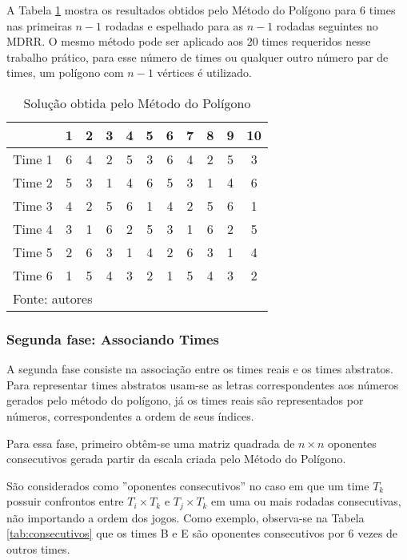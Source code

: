 \documentclass[12pt,a4paper]{article}
\renewcommand*{\arraystretch}{1.2}
\begin{document}
A Tabela \ref{tab:poligono} mostra os resultados obtidos pelo Método do Polígono para $6$ times nas primeiras $n-1$ rodadas e espelhado para as $n-1$ rodadas seguintes no MDRR. O mesmo método pode ser aplicado aos 20 times requeridos nesse trabalho prático, para esse número de times ou qualquer outro número par de times, um polígono com $n-1$ vértices é utilizado.

\begin{table}[H]
	\renewcommand{\arraystretch}{1}
	\centering
	\caption{Solução obtida pelo Método do Polígono}
	\label{tab:poligono}
	\begin{tabular}{l*{10}{c}}
		\toprule
		& 1 & 2 & 3 & 4 & 5 & 6 & 7 & 8 & 9 & 10 \\
		\midrule
		Time 1 & 6 & 4 & 2 & 5 & 3 & 6 & 4 & 2 & 5 & 3 \\
		Time 2 & 5 & 3 & 1 & 4 & 6 & 5 & 3 & 1 & 4 & 6 \\
		Time 3 & 4 & 2 & 5 & 6 & 1 & 4 & 2 & 5 & 6 & 1 \\
		Time 4 & 3 & 1 & 6 & 2 & 5 & 3 & 1 & 6 & 2 & 5 \\
		Time 5 & 2 & 6 & 3 & 1 & 4 & 2 & 6 & 3 & 1 & 4 \\
		Time 6 & 1 & 5 & 4 & 3 & 2 & 1 & 5 & 4 & 3 & 2 \\
		\bottomrule
		\multicolumn{11}{l}{\footnotesize Fonte: autores}
	\end{tabular}
\end{table}

\subsubsection{Segunda fase: Associando Times}

A segunda fase consiste na associação entre os times reais e os times abstratos. Para representar times abstratos usam-se as letras correspondentes aos números gerados pelo método do polígono, já os times reais são representados por números, correspondentes a ordem de seus índices.

Para essa fase, primeiro obtêm-se uma matriz quadrada de $n \times n$ oponentes consecutivos gerada partir da escala criada pelo Método do Polígono.

São considerados como ''oponentes consecutivos'' no caso em que um time $T_{k}$ possuir confrontos entre $T_{i} \times T_{k}$ e $T_{j} \times T_{k}$ em uma ou mais rodadas consecutivas, não importando a ordem dos jogos. Como exemplo, observa-se na Tabela \ref{tab:consecutivos} que os times B e E são oponentes consecutivos por 6 vezes de outros times.
\end{document}
